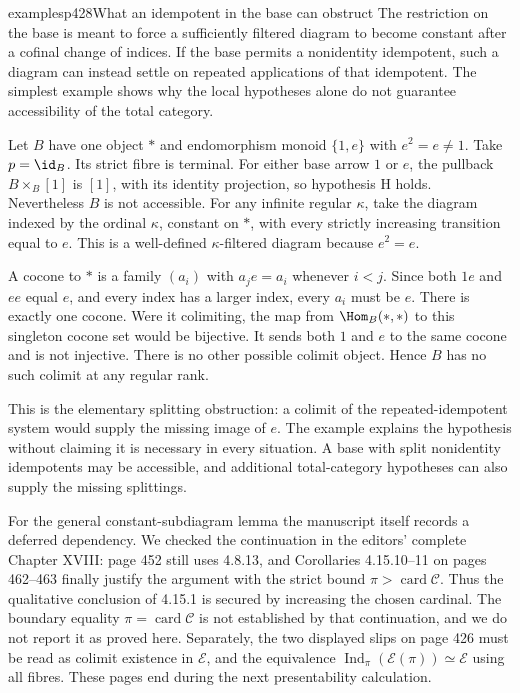 \begin{dcomment}{examples}{p428}{What an idempotent in the base can obstruct}
The restriction on the base is meant to force a sufficiently filtered diagram to become constant after a cofinal change of indices. If the base permits a nonidentity idempotent, such a diagram can instead settle on repeated applications of that idempotent. The simplest example shows why the local hypotheses alone do not guarantee accessibility of the total category.

Let $B$ have one object $*$ and endomorphism monoid $\{1,e\}$ with $e^2=e\ne1$. Take $p=\id_B$. Its strict fibre is terminal. For either base arrow $1$ or $e$, the pullback $B\times_B[1]$ is $[1]$, with its identity projection, so hypothesis H holds. Nevertheless $B$ is not accessible. For any infinite regular $\kappa$, take the diagram indexed by the ordinal $\kappa$, constant on $*$, with every strictly increasing transition equal to $e$. This is a well-defined $\kappa$-filtered diagram because $e^2=e$.

A cocone to $*$ is a family $(a_i)$ with $a_j e=a_i$ whenever $i<j$. Since both $1e$ and $ee$ equal $e$, and every index has a larger index, every $a_i$ must be $e$. There is exactly one cocone. Were it colimiting, the map from $\Hom_B(*,*)$ to this singleton cocone set would be bijective. It sends both $1$ and $e$ to the same cocone and is not injective. There is no other possible colimit object. Hence $B$ has no such colimit at any regular rank.

This is the elementary splitting obstruction: a colimit of the repeated-idempotent system would supply the missing image of $e$. The example explains the hypothesis without claiming it is necessary in every situation. A base with split nonidentity idempotents may be accessible, and additional total-category hypotheses can also supply the missing splittings.

For the general constant-subdiagram lemma the manuscript itself records a deferred dependency. We checked the continuation in the editors' complete Chapter XVIII: page 452 still uses 4.8.13, and Corollaries 4.15.10--11 on pages 462--463 finally justify the argument with the strict bound $\pi>\operatorname{card}\mathcal C$. Thus the qualitative conclusion of 4.15.1 is secured by increasing the chosen cardinal. The boundary equality $\pi=\operatorname{card}\mathcal C$ is not established by that continuation, and we do not report it as proved here. Separately, the two displayed slips on page 426 must be read as colimit existence in $\mathcal E$, and the equivalence $\operatorname{Ind}_\pi(\mathcal E(\pi))\simeq\mathcal E$ using all fibres. These pages end during the next presentability calculation.
\end{dcomment}
